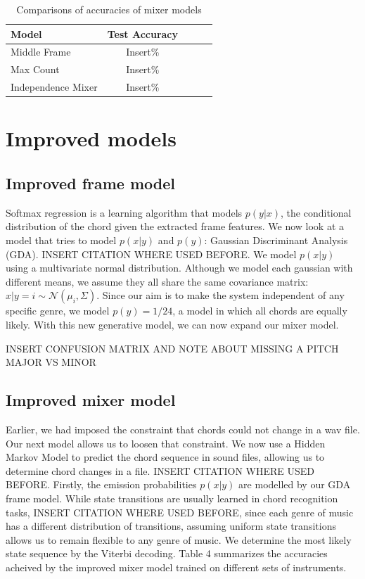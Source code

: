\documentclass{article}
\begin{document}
\begin{table}[t]
\caption{Comparisons of accuracies of mixer models}
\label{mfccvschroma}
\vskip 0.15in
\begin{center}
\begin{small}
\begin{sc}
\begin{tabular}{lcccr}
\hline
\abovespace\belowspace
Model & Test Accuracy \\
\hline
\abovespace
Middle Frame    & Insert\%\\
Max Count & Insert\%\\
Independence Mixer & Insert\%\\
\hline
\end{tabular}
\end{sc}
\end{small}
\end{center}
\vskip -0.1in
\end{table}

\section{Improved models}
\subsection{Improved frame model}
Softmax regression is a learning algorithm that models $p(y|x)$, the conditional distribution of the chord given the extracted frame features. We now look at a model that tries to model $p(x|y)$ and $p(y)$: Gaussian Discriminant Analysis (GDA). INSERT CITATION WHERE USED BEFORE. We model $p(x|y)$ using a multivariate normal distribution. Although we model each gaussian with different means, we assume they all share the same covariance matrix: $x|y=i \sim \mathcal{N}$$(\mu_i, \Sigma)$. Since our aim is to make the system independent of any specific genre, we model $p(y) = 1/24$, a model in which all chords are equally likely. With this new generative model, we can now expand our mixer model.

INSERT CONFUSION MATRIX AND NOTE ABOUT MISSING A PITCH MAJOR VS MINOR

\subsection{Improved mixer model}
Earlier, we had imposed the constraint that chords could not change in a wav file. Our next model allows us to loosen that constraint. We now use a Hidden Markov Model to predict the chord sequence in sound files, allowing us to determine chord changes in a file. INSERT CITATION WHERE USED BEFORE. Firstly, the emission probabilities $p(x|y)$ are modelled by our GDA frame model. While state transitions are usually learned in chord recognition tasks, INSERT CITATION WHERE USED BEFORE, since each genre of music has a different distribution of transitions, assuming uniform state transitions allows us to remain flexible to any genre of music. We determine the most likely state sequence by the Viterbi decoding. Table 4 summarizes the accuracies acheived by the improved mixer model trained on different sets of instruments.
\end{document}
